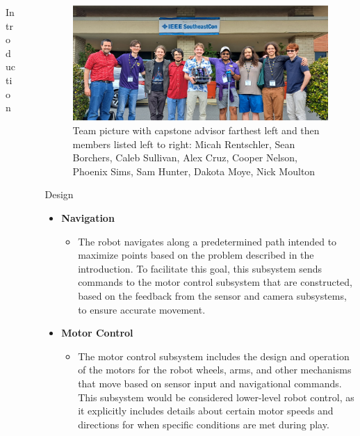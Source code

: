 \documentclass[final]{beamer}
\newlength{\sepwidth}
\newlength{\colwidth}
\newcommand{\separatorcolumn}{\begin{column}{\sepwidth}\end{column}}
\begin{document}
\begin{frame}[t]
\begin{columns}[t]
\begin{column}{\colwidth}
\begin{block}{Introduction}
  \end{block}
 

\end{column}

\separatorcolumn

\begin{column}{\colwidth}

    \begin{figure}
      \centering
      \includegraphics[width=30.0cm]{Team Picture SECON 2025.jpg}
      \caption{Team picture with capstone advisor farthest left and then members listed left to right: Micah Rentschler, Sean Borchers, Caleb Sullivan, Alex Cruz, Cooper Nelson, Phoenix Sims, Sam Hunter, Dakota Moye, Nick Moulton}
    \end{figure}

    \begin{block}{Design}
    \begin{itemize}
    
      \item \textbf{Navigation}
        \begin{itemize}
          \item The robot navigates along a predetermined path intended to maximize points based on the problem described in the introduction. To facilitate this goal, this subsystem sends commands to the motor control subsystem that are constructed, based on the feedback from the sensor and camera subsystems, to ensure accurate movement.
        \end{itemize}
        
      \item \textbf{Motor Control}
        \begin{itemize}
          \item The motor control subsystem includes the design and operation of the motors for the robot wheels, arms, and other mechanisms that move based on sensor input and navigational commands. This subsystem would be considered lower-level robot control, as it explicitly includes details about certain motor speeds and directions for when specific conditions are met during play.
        \end{itemize}
      

\end{itemize}
\end{block}
\end{column}
\end{columns}
\end{frame}
\end{document}
